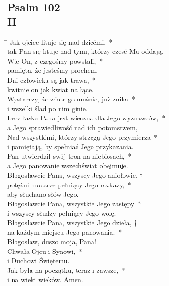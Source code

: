\subsection*{Psalm 102\\II}
\begin{tabbing}
\hspace{4mm} \= \>\kill
Jak ojciec lituje się nad dziećmi,~*\\
tak Pan się lituje nad tymi, którzy cześć Mu oddają.\\
\>Wie On, z czegośmy powstali,~*\\
\>pamięta, że jesteśmy prochem.\\
Dni człowieka są jak trawa,~*\\
kwitnie on jak kwiat na łące.\\
\>Wystarczy, że wiatr go muśnie, już znika~*\\
\>i wszelki ślad po nim ginie.\\
Lecz łaska Pana jest wieczna dla Jego wyznawców,~*\\
a Jego sprawiedliwość nad ich potomstwem,\\
\>Nad wszystkimi, którzy strzegą Jego przymierza~*\\
\>i pamiętają, by spełniać Jego przykazania.\\
Pan utwierdził swój tron na niebiosach,~*\\
a Jego panowanie wszechświat obejmuje.\\
\>Błogosławcie Pana, wszyscy Jego aniołowie, †\\
\>potężni mocarze pełniący Jego rozkazy,~*\\
\>aby słuchano słów Jego.\\
Błogosławcie Pana, wszystkie Jego zastępy~*\\
i wszyscy słudzy pełniący Jego wolę.\\
\>Błogosławcie Pana, wszystkie Jego dzieła, †\\
\>na każdym miejscu Jego panowania.~*\\
\>Błogosław, duszo moja, Pana!\\
Chwała Ojcu i Synowi,~*\\
i Duchowi Świętemu.\\
\>Jak była na początku, teraz i zawsze,~*\\
\>i na wieki wieków. Amen.
\end{tabbing}
